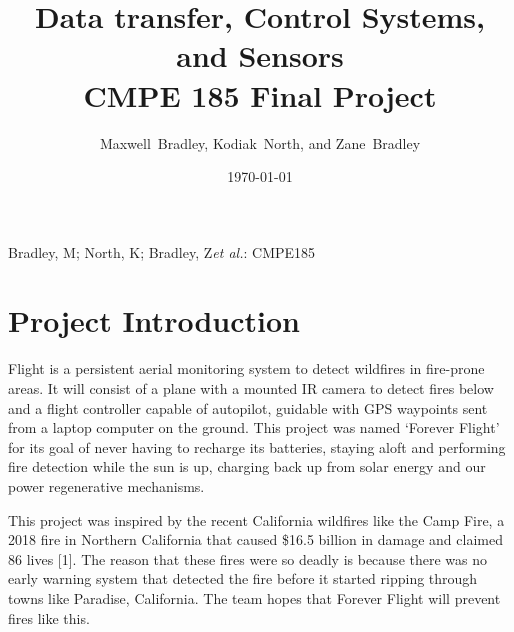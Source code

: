 \documentclass[12pt,journal,compsoc]{IEEEtran}
\begin{document}
\title{Data transfer, Control Systems, and Sensors\\
	CMPE 185 Final Project}
\author{Maxwell~Bradley, Kodiak~North, and Zane~Bradley}

\date{\today} %

%
{Bradley, M; North, K; Bradley, Z\MakeLowercase{\textit{et al.}}: CMPE185}


\maketitle

\tableofcontents 

\section{Project Introduction}

 Flight is a persistent aerial monitoring system to detect wildfires in fire-prone areas. It will consist of a plane with a mounted IR camera to detect fires below and a flight controller capable of autopilot, guidable with GPS waypoints sent from a laptop computer on the ground. This project was named ‘Forever Flight' for its goal of never having to recharge its batteries, staying aloft and performing fire detection while the sun is up, charging back up from solar energy and our power regenerative mechanisms. 

This project was inspired by the recent California wildfires like the Camp Fire, a 2018 fire in Northern California that caused \$16.5 billion in damage and claimed 86 lives [1]. The reason that these fires were so deadly is because there was no early warning system that detected the fire before it started ripping through towns like Paradise, California. The team hopes that Forever Flight will prevent fires like this.
\end{document}
